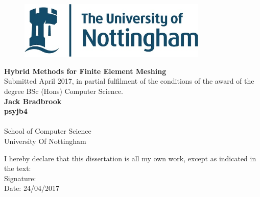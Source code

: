 \documentclass{article}
\begin{document}


\begin{center}

\noindent

\begin{figure}[h!!]
  \centerline{\includegraphics[width=90mm, scale=0.5]{../Graphics/nottinghamLogo.jpeg}}
\end{figure}


\vspace{0.8cm}
\LARGE
\textbf{Hybrid Methods for Finite Element Meshing}\\
\normalsize
\vspace{0.8cm}
Submitted April 2017, in partial fulfilment of
the conditions of the award of the degree BSc (Hons) Computer Science.\\
\vspace{0.4cm}
\Large
\textbf{Jack Bradbrook}\\
\vspace{0.4cm}
\textbf{psyjb4}\\\\
\normalsize
\vspace{0.4cm}
School of Computer Science\\
\vspace{0.4cm}
University Of Nottingham\\ 
\vspace{0.4cm}

\noindent
I hereby declare that this dissertation is all my own work, except as indicated
in the text: \\ 

\vspace{0.4cm}
\noindent
Signature: \\ 

\vspace{2.0cm}
\noindent
Date: 24/04/2017 \\ 

\vspace{0.4cm}

\end{center}
\end{document}
